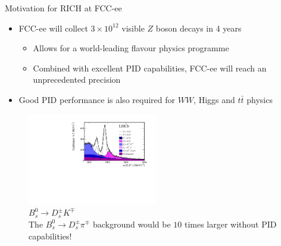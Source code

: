 \documentclass{beamer}
\begin{document}
\begin{frame}{Motivation for RICH at FCC-ee}
  \begin{itemize}
    \setlength\itemsep{1.0em}
    \item{FCC-ee will collect $3\times 10^{12}$ visible $Z$ boson decays in $4$ years}
    \begin{itemize}
      \item{Allows for a world-leading flavour physics programme}
      \item{Combined with excellent PID capabilities, FCC-ee will reach an unprecedented precision}
    \end{itemize}
    \item{Good PID performance is also required for $WW$, Higgs and $t\bar{t}$ physics}
  \end{itemize}
  \begin{figure}
    \centering
    \vspace{-0.2cm}
    \includegraphics[height = 4cm]{Plots/LHCb_BsDsK.pdf}
    \caption{$B_s^0\to D_s^\pm K^\mp$\\The $B_s^0\to D_s^\pm\pi^\mp$ background would be $10$ times larger without PID capabilities!}
  \end{figure}
\end{frame}
\end{document}
